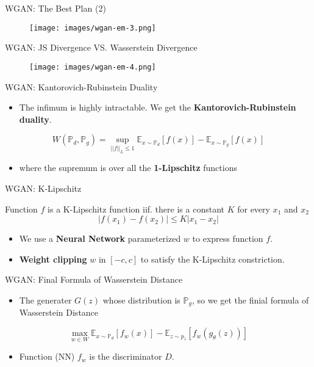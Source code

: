 \documentclass[handout]{beamer}
\begin{document}
\begin{frame}{WGAN: The Best Plan (2)}
	\begin{figure}
		\centering
		\texttt{[image: images/wgan-em-3.png]}
	\end{figure}
\end{frame}

\begin{frame}{WGAN: JS Divergence VS. Wasserstein Divergence}
	\begin{figure}
		\centering
		\texttt{[image: images/wgan-em-4.png]}
	\end{figure}
\end{frame}

\begin{frame}[<+->]{WGAN: Kantorovich-Rubinstein Duality}
	\begin{itemize}
		\item The infimum is highly intractable. We get the \textbf{ Kantorovich-Rubinstein duality}.
	\end{itemize}
	\begin{actionenv}
		$$W(\mathbb{P}_d, \mathbb{P}_g) = \sup_{||f||_L \leqslant 1} \mathbb{E}_{x \sim \mathbb{P}_d}[f(x)] - \mathbb{E}_{x \sim \mathbb{P}_g}[f(x)]$$
	\end{actionenv}
	\begin{itemize}
		\item where the supremum is over all the \textbf{1-Lipschitz} functions
	\end{itemize}
\end{frame}

\begin{frame}[<+->]{WGAN: K-Lipschitz}
	\begin{definition}
		Function $f$ is a K-Lipschitz function iif. there is a constant $K$ for every $x_1$ and $x_2$
		$$|f(x_1) - f(x_2)| \leqslant K|x_1 - x_2|$$
	\end{definition}
	\begin{itemize}
		\item We use a \textbf{Neural Network} parameterized $w$ to express function $f$.
		\item \textbf{Weight clipping} $w$ in $[-c, c]$ to satisfy the K-Lipschitz constriction.
	\end{itemize}
\end{frame}

\begin{frame}[<+->]{WGAN: Final Formula of Wasserstein Distance}
	\begin{itemize}
		\item The generater $G(z)$ whose distribution is $\mathbb{P}_g$, so we get the finial formula of Wasserstein Distance
	\end{itemize}
	\begin{actionenv}
		$$\max_{w \in W} \mathbb{E}_{x \sim \mathbb{P}_d}[f_w(x)] - \mathbb{E}_{z \sim p_z}[f_w(g_\theta(z))]$$
	\end{actionenv}
	 \begin{itemize}
		 \item Function (NN) $f_w$ is the discriminator $D$.
	 \end{itemize}
\end{frame}
\end{document}
